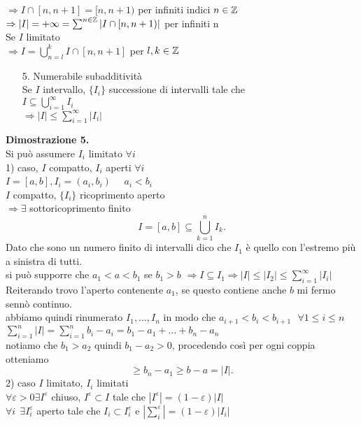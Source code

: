 \documentclass{article}
\begin{document}
$ \Rightarrow  I\cap[n,n+1] = [n,n+1) $ per infiniti indici $n\in\mathbb{Z}$\\
$ \Rightarrow |I| = +\infty = \sum^{n\in\mathbb{Z}}|I\cap[n,n+1)|$ per infiniti n\\
Se $I$ limitato\\
$ \Rightarrow  I = \bigcup^k_{n = l}I\cap [n,n+1]$ per $l,k\in\mathbb{Z}$\\
\begin{enumerate}
	\item[5.] Numerabile subadditività\\
		Se $I$ intervallo, $\{I_i\}$ successione di intervalli tale che\\
		$I\subseteq\bigcup^\infty_{i=1} I_i$\\
		$ \Rightarrow  |I|\leq \sum^\infty_{i=1} |I_i|$
\end{enumerate}
\textbf{Dimostrazione 5.}\\
Si può assumere $I_i$ limitato $\forall i$\\
1) caso,  $I$ compatto, $I_i$ aperti $\forall i$\\
$I = [a,b], I_i = (a_i,b_i)$ \ \  $a_i<b_i$\\
$I$ compatto, $\{I_i\}$ ricoprimento aperto\\
$ \Rightarrow \exists$ sottoricoprimento finito
\[
	I = [a,b]\subseteq\bigcup^n_{k=1}I_{k}
.\] 
Dato che sono un numero finito di intervalli dico che $I_1$ è quello con l'estremo più a sinistra di tutti.\\
si può supporre che $a_1 < a < b_1$ se $b_1 > b$ $ \Rightarrow  I\subseteq I_1 \Rightarrow |I| \leq |I_2|\leq \sum^\infty_{i=1}|I_i|$\\
Reiterando trovo l'aperto contenente $a_1$, se questo contiene anche $b$ mi fermo sennò continuo.\\
abbiamo quindi rinumerato $I_1,\ldots,I_n$ in modo che  $a_{i+1} < b_i < b_{i+1} \ \ \ \forall 1\leq i\leq n$\\
 $ \sum^n_{i=1}|I| = \sum^n_{i=1}b_i -a_i = b_1-a_1 + \ldots + b_n-a_n$\\
 notiamo che $b_1 > a_2$ quindi $b_1 - a_2 > 0$, procedendo così per ogni coppia otteniamo
  \[
 \geq b_n - a_1\geq b - a = |I|
 .\] 
 2) caso $I$ limitato, $I_i$ limitati\\
 $\forall\varepsilon > 0 \exists I^\varepsilon$ chiuso, $I^\varepsilon \subset I$ tale che  $ |I^\varepsilon|  = (1-\varepsilon)|I|$\\
  $\forall i \ \ \exists I^\varepsilon_i$ aperto tale che  $I_i\subset I^\varepsilon_i$ e $| \sum^\varepsilon_{i}| = (1-\varepsilon)|I_i|$\\
\end{document}

